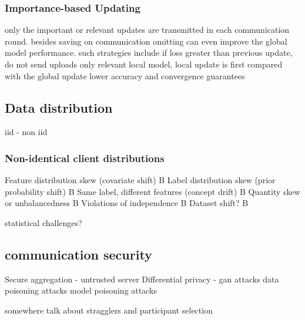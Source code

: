     \subsubsection{Importance-based Updating}
    only the important or relevant updates are transmitted in each communication round.
    besides saving on communication omitting can even improve the global model performance.
    such strategies include
    if loss greater than previous update, do not send
    uploads only relevant local model, local update is first compared with the global update
    lower accuracy and convergence guarantees

\subsection{Data distribution}
    iid - non iid
    \subsubsection{Non-identical client distributions}
    Feature distribution skew (covariate shift) B
    Label distribution skew (prior probability shift) B
    Same label, different features (concept drift) B
    Quantity skew or unbalancedness B
    Violations of independence B
    Dataset shift? B
    
    statistical challenges?


\subsection{communication security}
Secure aggregation - untrusted server
Differential privacy - gan attacks
data poisoning attacks
model poisoning attacks






somewhere talk about stragglers and participant selection